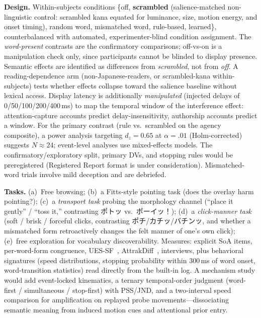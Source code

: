 \documentclass[sigconf,nonacm]{acmart}
\newcommand{\jp}[1]{#1}
\begin{document}
\textbf{Design.} Within-subjects conditions \{off, \textbf{scrambled} (salience-matched non-linguistic control: scrambled kana equated for luminance, size, motion energy, and onset timing), random word, mismatched word, rule-based, learned\}, counterbalanced with automated, experimenter-blind condition assignment. The \emph{word-present} contrasts are the confirmatory comparisons; off-vs-on is a manipulation check only, since participants cannot be blinded to display presence. Semantic effects are identified as differences from \emph{scrambled}, not from \emph{off}. A reading-dependence arm (non-Japanese-readers, or scrambled-kana within-subjects) tests whether effects collapse toward the salience baseline without lexical access. Display latency is additionally \emph{manipulated} (injected delays of 0/50/100/200/400\,ms) to map the temporal window of the interference effect: attention-capture accounts predict delay-insensitivity, authorship accounts predict a window. For the primary contrast (rule vs.\ scrambled on the agency composite), a power analysis targeting $d_z{=}0.65$ at $\alpha{=}.01$ (Holm-corrected) suggests $N{\approx}24$; event-level analyses use mixed-effects models. The confirmatory/exploratory split, primary DVs, and stopping rules would be preregistered (Registered Report format is under consideration). Mismatched-word trials involve mild deception and are debriefed.

\textbf{Tasks.} (a)~Free browsing; (b)~a Fitts-style pointing task (does the overlay harm pointing?); (c)~a \emph{transport task} probing the morphology channel (``place it gently'' / ``toss it,'' contrasting \jp{ポトッ} vs.\ \jp{ポーイッ！}); (d)~a \emph{click-manner task} (soft / brisk / forceful clicks, contrasting \jp{ポチ}/\jp{カチッ}/\jp{バチンッ}, and whether a mismatched form retroactively changes the felt manner of one's own click); (e)~free exploration for vocabulary discoverability. Measures: explicit SoA items, per-word-form congruence, UES-SF~\cite{obrien2018ues}, AttrakDiff~\cite{hassenzahl2003attrakdiff}, interviews, plus behavioral signatures (speed distributions, stopping probability within 300\,ms of word onset, word-transition statistics) read directly from the built-in log. A mechanism study would add event-locked kinematics, a ternary temporal-order judgment (word-first / simultaneous / stop-first) with PSS/JND, and a two-interval speed comparison for amplification on replayed probe movements---dissociating semantic meaning from induced motion cues and attentional prior entry.
\end{document}
